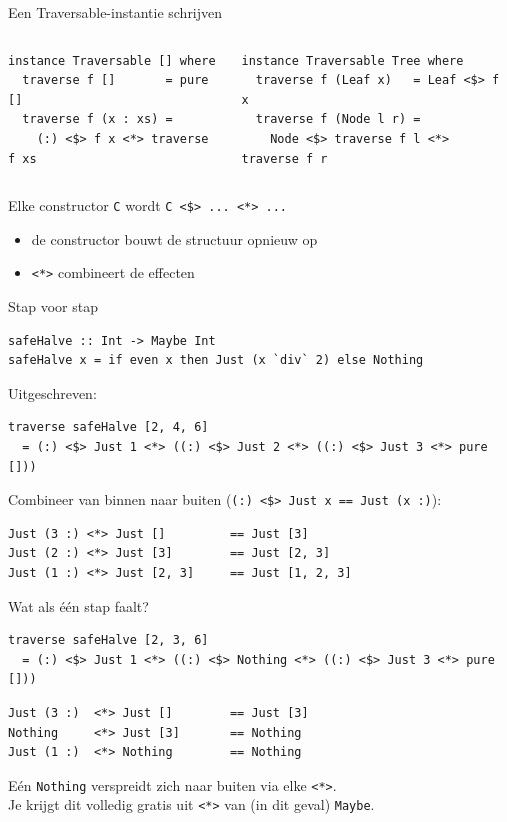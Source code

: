 \documentclass[aspectratio=169,11pt]{beamer}
\newcommand{\hs}{\lstinline[style=hsinline]}
\begin{document}
\begin{frame}[fragile]{Een Traversable-instantie schrijven}
  \begin{columns}[T]
\begin{lstlisting}
instance Traversable [] where
  traverse f []       = pure []
  traverse f (x : xs) =
    (:) <$> f x <*> traverse f xs
\end{lstlisting}
\begin{lstlisting}
instance Traversable Tree where
  traverse f (Leaf x)   = Leaf <$> f x
  traverse f (Node l r) =
    Node <$> traverse f l <*> traverse f r
\end{lstlisting}
  \end{columns}
  \pause
  Elke constructor \hs{C} wordt \hs{C <$> ... <*> ...}
  \begin{itemize}
    \item de constructor bouwt de structuur opnieuw op
    \item \hs{<*>} combineert de effecten
  \end{itemize}
\end{frame}

\begin{frame}[fragile]{Stap voor stap}
\begin{lstlisting}
safeHalve :: Int -> Maybe Int
safeHalve x = if even x then Just (x `div` 2) else Nothing
\end{lstlisting}
  \pause
  Uitgeschreven:
\begin{lstlisting}
traverse safeHalve [2, 4, 6]
  = (:) <$> Just 1 <*> ((:) <$> Just 2 <*> ((:) <$> Just 3 <*> pure []))
\end{lstlisting}
  \pause
  Combineer van binnen naar buiten (\hs{(:) <$> Just x == Just (x :)}):
\begin{lstlisting}
Just (3 :) <*> Just []         == Just [3]
Just (2 :) <*> Just [3]        == Just [2, 3]
Just (1 :) <*> Just [2, 3]     == Just [1, 2, 3]
\end{lstlisting}
\end{frame}

\begin{frame}[fragile]{Wat als één stap faalt?}
\begin{lstlisting}
traverse safeHalve [2, 3, 6]
  = (:) <$> Just 1 <*> ((:) <$> Nothing <*> ((:) <$> Just 3 <*> pure []))
\end{lstlisting}
  \pause
\begin{lstlisting}
Just (3 :)  <*> Just []        == Just [3]
Nothing     <*> Just [3]       == Nothing
Just (1 :)  <*> Nothing        == Nothing
\end{lstlisting}
  \pause
  Eén \hs{Nothing} verspreidt zich naar buiten via elke \hs{<*>}.\\
  Je krijgt dit volledig gratis uit \hs{<*>} van (in dit geval) \hs{Maybe}.
\end{frame}
\end{document}
